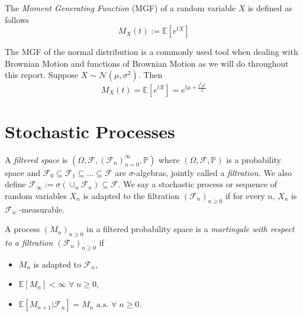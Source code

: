 \begin{definition}
    The \emph{Moment Generating Function} (MGF) of a random variable $X$ is defined as follows
    \begin{equation}
        M_X(t):=\mathbb{E}[e^{tX}]
    \end{equation}
\end{definition}

\begin{remark}
    The MGF of the normal distribution is a commonly used tool when dealing with
    Brownian Motion and functions of Brownian Motion as we will do throughout this
    report. Suppose $X\sim\mathcal{N}(\mu,\sigma^2)$. Then
    \begin{equation}
        M_X(t)=\mathbb{E}[e^{tX}]=e^{t\mu+\frac{t^2\sigma^2}{2}}
    \end{equation}
\end{remark}

\section{Stochastic Processes}

\begin{definition}
    A \emph{filtered space} is $(\Omega,\mathcal{F},(\mathcal{F}_n)_{n=0}^\infty,\mathbb{P})$
    where $(\Omega,\mathcal{F},\mathbb{P})$ is a probability space and 
    $\mathcal{F}_0\subseteq\mathcal{F}_1\subseteq\dots\subseteq\mathcal{F}$
    are $\sigma$-algebras, jointly called a \emph{filtration.} We also define
    $\mathcal{F}_\infty:=\sigma(\cup_n\mathcal{F}_n)\subseteq\mathcal{F}.$ We
    say a stochastic process or sequence of random variables $X_n$ is adapted to
    the filtration $(\mathcal{F}_n)_{n\geq0}$ if for every $n$, $X_n$ is $\mathcal{F}_n$
    -measurable. 
\end{definition}

\begin{definition}[Martingales]
    A process $(M_n)_{n\geq0}$ in a filtered probability space is a
    \emph{martingale with respect to a filtration $(\mathcal{F}_n)_{n\geq0}$}
    if
    \begin{itemize}
        \item $M_n$ is adapted to $\mathcal{F}_n$,
        \item $\mathbb{E}[M_n]<\infty\;\forall\;n\geq0$,
        \item $\mathbb{E}[M_{n+1}|\mathcal{F}_n]=M_n\textrm{ a.s. }\forall\;n\geq0.$
    \end{itemize}
\end{definition}

